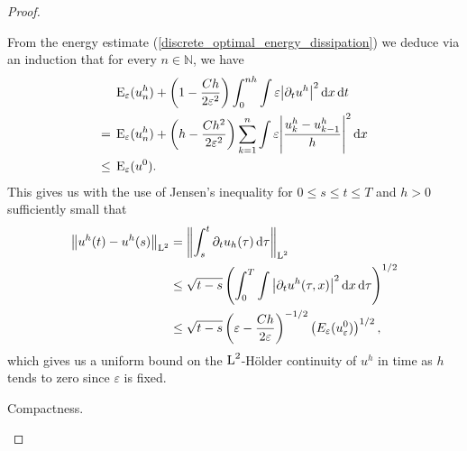 \begin{proof}
\begin{description}[wide=0pt]
		From the energy estimate (\ref{discrete_optimal_energy_dissipation}) we 
		deduce via an induction that for every $ n \in \mathbb{ N } $, we have
		\begin{align}
			& \operatorname{E}_{ \varepsilon } ( u_{ n }^{ h } )
			+
			\left(
			1
			-
			\frac{ C h  }{ 2 \varepsilon^{ 2 } }
			\right)
			\int_{ 0 }^{ n h }
			\int
			\varepsilon
			\abs{ \partial_{ t } u^{ h } }^{ 2 }
			\dd{ x }
			\dd{ t }
			\notag
			\\
			={} &
			\operatorname{E}_{ \varepsilon } ( u_{ n }^{ h } )
			+
			\left(
			h - \frac{ C h^{ 2 }}{ 2 \varepsilon^{ 2 } }
			\right)
			\sum_{k = 1 }^{ n }
			\int
			\varepsilon
			\abs{
				\frac{ u_{ k }^{ h } - u_{ k - 1 }^{ h } }{ h }
			}^{ 2 }
			\dd{ x }
			\notag
			\\
			\label{energy_and_time_derivative_bound}
			\leq {} &
			\operatorname{E}_{ \varepsilon } ( u^{ 0 } ).
		\end{align}
		This gives us with the use of Jensen's inequality for $ 0\leq s \leq t 
		\leq T $ and $ h > 0 $ sufficiently small that
		\begin{align}
			\norm{ u^{ h } ( t ) - u^{ h } ( s ) }_{ \operatorname{L}^{ 2 } }
			& =
			\norm{ 
				\int_{ s }^{ t }
				\partial_{ t } u_{ h } ( \tau )
				\dd{ \tau }
			}_{ \operatorname{L}^{ 2 } }
			\notag
			\\
			& \leq
			\sqrt{ t - s }
			\left(	
			\int_{ 0 }^{ T }
			\int
			\abs{ \partial_{ t } u^{ h } ( \tau, x ) }^{ 2 }
			\dd{ x }
			\dd{ \tau }
			\right)^{ 1/2 }
			\notag
			\\
			\label{hölder_continuity_of_uh}
			& \leq
			\sqrt{ t - s }
			\left(
			\varepsilon - \frac{ C h }{ 2 \varepsilon }
			\right)^{ - 1/2 }
			\left(  E_{ \varepsilon } ( u_{ \varepsilon }^{ 0 } ) \right)^{ 1/ 2 },
		\end{align}
		which gives us a uniform bound on the $ \operatorname{L}^{ 2 }$-Hölder continuity of 
		$ u^{ h } $ in time as $ h $ tends to zero since $ \varepsilon $ is 
		fixed.
		
		\item[Step 5:] Compactness.
		

\end{description}
\end{proof}
